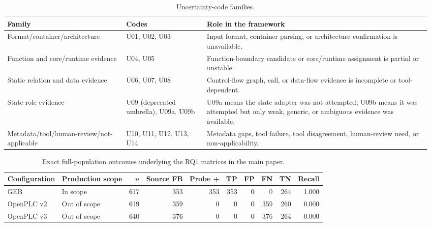 \documentclass[a4paper,fleqn]{cas-dc}
\begin{document}
\begin{table}[t]
\centering
\small
\caption{Uncertainty-code families.}
\label{tab:uncertainty_families}
\begin{tabularx}{\textwidth}{>{\raggedright\arraybackslash}X>{\raggedright\arraybackslash}X>{\raggedright\arraybackslash}X}
\toprule
Family & Codes & Role in the framework \\
\midrule
Format/container/architecture & U01, U02, U03 & Input format, container parsing, or architecture confirmation is unavailable. \\
Function and core/runtime evidence & U04, U05 & Function-boundary candidate or core/runtime assignment is partial or unstable. \\
Static relation and data evidence & U06, U07, U08 & Control-flow graph, call, or data-flow evidence is incomplete or tool-dependent. \\
State-role evidence & U09 (deprecated umbrella), U09a, U09b & U09a means the state adapter was not attempted; U09b means it was attempted but only weak, generic, or ambiguous evidence was available. \\
Metadata/tool/human-review/not-applicable & U10, U11, U12, U13, U14 & Metadata gaps, tool failure, tool disagreement, human-review need, or non-applicability. \\
\bottomrule
\end{tabularx}
\end{table}

\begin{table}[t]
\centering
\small
\caption{Exact full-population outcomes underlying the RQ1 matrices in the main paper.}
\label{tab:source_oracle_counts}
\begin{tabularx}{\textwidth}{>{\raggedright\arraybackslash}X>{\raggedright\arraybackslash}p{}rrrrrrrr}
\toprule
Configuration & Production scope & $n$ & Source FB & Probe + & TP & FP & FN & TN & Recall \\
\midrule
GEB & In scope & 617 & 353 & 353 & 353 & 0 & 0 & 264 & 1.000 \\
OpenPLC v2 & Out of scope & 619 & 359 & 0 & 0 & 0 & 359 & 260 & 0.000 \\
OpenPLC v3 & Out of scope & 640 & 376 & 0 & 0 & 0 & 376 & 264 & 0.000 \\
\bottomrule
\end{tabularx}
\end{table}
\end{document}

